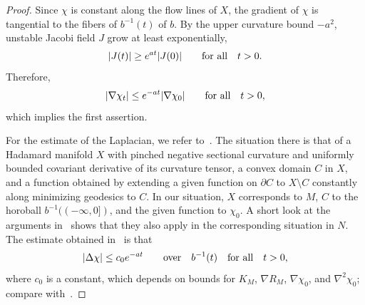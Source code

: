 \documentclass[11pt]{article}
\numberwithin{equation}{section}
\numberwithin{equation}{section}
\begin{document}
\begin{proof}
Since $\chi$ is constant along the flow lines of $X$,
the gradient of $\chi$ is tangential to the fibers of $b^{-1}(t)$ of $b$.
By the upper curvature bound $-a^2$, unstable Jacobi field $J$ grow at least exponentially,
\begin{align*}
	|J(t)| \ge {\rm e}^{at} |J(0)| \qquad\text{for all} \quad t>0.
\end{align*}
Therefore,
\begin{align*}%
	|\nabla\chi_t| \le {\rm e}^{-at} |\nabla\chi_0| \qquad\text{for all}\quad t>0,
\end{align*}
which implies the first assertion.

For the estimate of the Laplacian, we refer to~\cite[Section 6]{BP21b}.
The situation there is that of a Hadamard manifold $X$ with pinched negative sectional curvature
and uniformly bounded covariant derivative of its curvature tensor,
a convex domain $C$ in $X$,
and a function obtained by extending a given function on $\partial C$
to $X\setminus C$ constantly along minimizing geodesics to $C$.
In our situation, $X$ corresponds to $M$, $C$ to the horoball $b^{-1}((-\infty,0])$,
and the given function to $\chi_0$.
A short look at the arguments in~\cite[Section 6]{BP21b} shows
that they also apply in the corresponding situation in $N$.
The estimate obtained in~\cite{BP21b} is that
\begin{align*}
	|\Delta\chi| \le c_0{\rm e}^{-at} \qquad\text{over} \quad b^{-1}(t)\quad \text{for all} \quad t>0,
\end{align*}
where $c_0$ is a constant, which depends on bounds for $K_M$, $\nabla R_M$, $\nabla\chi_0$, and $\nabla^2\chi_0$;
compare with~\cite[formula~(6.4) and end of Section~6]{BP21b}.
\end{proof}
\end{document}
